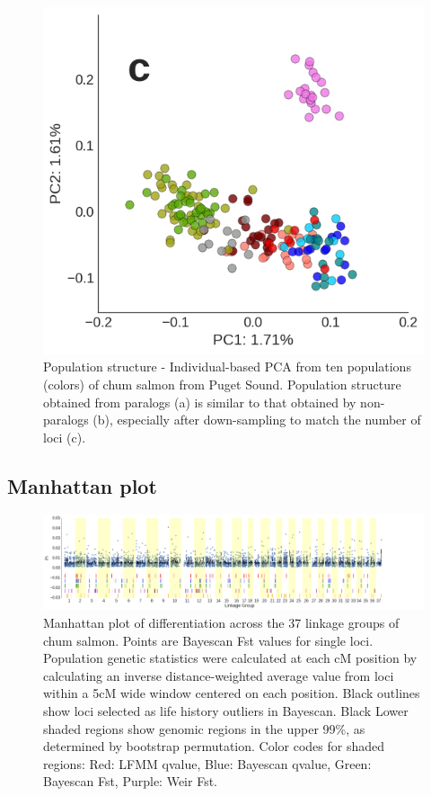 \documentclass[12pt, one column]{article}
\begin{document}
\begin{figure}[H]
\includegraphics[scale=.35]{figures/poster_3c.png}
\caption[Individual-based PCAs showing population structure]{Population structure - Individual-based PCA from ten populations (colors) of chum salmon from Puget Sound.  Population structure obtained from paralogs (a) is similar to that obtained by non-paralogs (b), especially after down-sampling to match the number of loci (c).}
\end{figure}

\begin{landscape}
\subsection*{Manhattan plot}
\begin{figure}[H]
\includegraphics[scale=.25]{figures/Bayescan_Fst_and_bootstrap.png}
\caption[Manhattan plot]{Manhattan plot of differentiation across the 37 linkage groups of chum salmon.  Points are Bayescan Fst values for single loci. Population genetic statistics were calculated at each cM position by calculating an inverse distance-weighted average value from loci within a 5cM wide window centered on each position.  Black outlines show loci selected as life history outliers in Bayescan. Black Lower shaded regions show genomic regions in the upper 99\%, as determined by bootstrap permutation. Color codes for shaded regions: Red: LFMM qvalue, Blue: Bayescan qvalue, Green: Bayescan Fst, Purple: Weir Fst.}
\end{figure}
\end{landscape}
\end{document}
